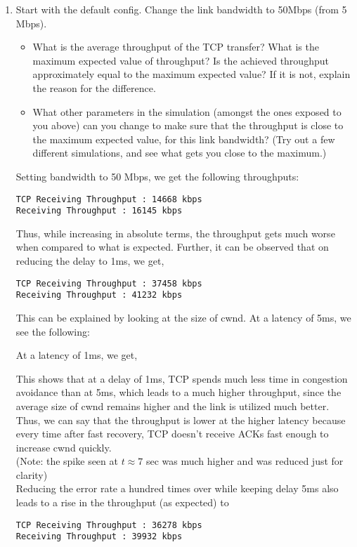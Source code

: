 \documentclass[a4paper]{article}
\begin{document}
\begin{enumerate}
\item Start with the default config. Change the link bandwidth to 50Mbps (from 5 Mbps).
\begin{itemize}
	\item What is the average throughput of the TCP transfer? What is the maximum expected value of throughput? Is the achieved throughput approximately equal to the maximum expected value? If it is not, explain the reason for the difference. 
	\item What other parameters in the simulation (amongst the ones exposed to you above) can you change to make sure that the throughput is close to the maximum expected value, for this link bandwidth? (Try out a few different simulations, and see what gets you close to the maximum.) 
\end{itemize}

Setting bandwidth to 50 Mbps, we get the following throughputs:
\begin{verbatim}
TCP Receiving Throughput : 14668 kbps
Receiving Throughput : 16145 kbps
\end{verbatim}
Thus, while increasing in absolute terms, the throughput gets much worse when compared to what is expected. Further, it can be observed that on reducing the delay to 1ms, we get,
\begin{verbatim}
TCP Receiving Throughput : 37458 kbps
Receiving Throughput : 41232 kbps
\end{verbatim}
This can be explained by looking at the size of cwnd. At a latency of 5ms, we see the following:
\begin{center}\end{center}
At a latency of 1ms, we get,
\begin{center}\end{center}
This shows that at a delay of 1ms, TCP spends much less time in congestion avoidance than at 5ms, which leads to a much higher throughput, since the average size of cwnd remains higher and the link is utilized much better. Thus, we can say that the throughput is lower at the higher latency because every time after fast recovery, TCP doesn't receive ACKs fast enough to increase cwnd quickly.\\
(Note: the spike seen at $t\approx7$ sec was much higher and was reduced just for clarity)\\

Reducing the error rate a hundred times over while keeping delay 5ms also leads to a rise in the throughput (as expected) to
\begin{verbatim}
TCP Receiving Throughput : 36278 kbps
Receiving Throughput : 39932 kbps
\end{verbatim}


\end{enumerate}
\end{document}
